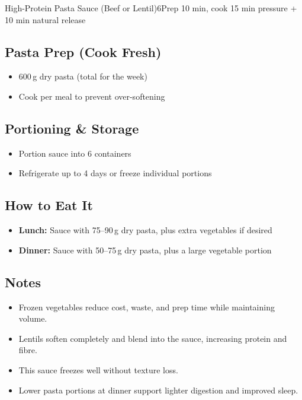 \begin{recipebox}{High-Protein Pasta Sauce (Beef or Lentil)}{6}{Prep 10 min, cook 15 min pressure + 10 min natural release}
\subsection*{Pasta Prep (Cook Fresh)}
\begin{itemize}
    \item 600\,g dry pasta (total for the week)
    \item Cook per meal to prevent over-softening
\end{itemize}

\subsection*{Portioning \& Storage}
\begin{itemize}
    \item Portion sauce into 6 containers
    \item Refrigerate up to 4 days or freeze individual portions
\end{itemize}

\subsection*{How to Eat It}
\begin{itemize}
    \item \textbf{Lunch:} Sauce with 75--90\,g dry pasta, plus extra vegetables if desired
    \item \textbf{Dinner:} Sauce with 50--75\,g dry pasta, plus a large vegetable portion
\end{itemize}

\subsection*{Notes}
\begin{itemize}
    \item Frozen vegetables reduce cost, waste, and prep time while maintaining volume.
    \item Lentils soften completely and blend into the sauce, increasing protein and fibre.
    \item This sauce freezes well without texture loss.
    \item Lower pasta portions at dinner support lighter digestion and improved sleep.
\end{itemize}
\end{recipebox}
